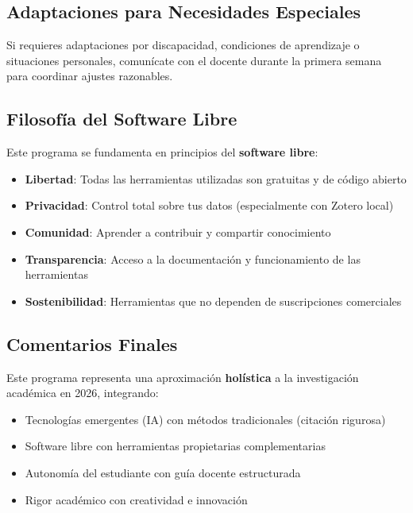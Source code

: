 \documentclass[12pt,a4paper]{yaac-luatex}
\begin{document}
	\subsection*{Adaptaciones para Necesidades Especiales}
	
	Si requieres adaptaciones por discapacidad, condiciones de aprendizaje o situaciones personales, comunícate con el docente durante la primera semana para coordinar ajustes razonables.
	
	\subsection*{Filosofía del Software Libre}
	
	Este programa se fundamenta en principios del \textbf{software libre}:
	
	\begin{itemize}[leftmargin=*, itemsep=0.2cm]
		\item \textbf{Libertad}: Todas las herramientas utilizadas son gratuitas y de código abierto
		\item \textbf{Privacidad}: Control total sobre tus datos (especialmente con Zotero local)
		\item \textbf{Comunidad}: Aprender a contribuir y compartir conocimiento
		\item \textbf{Transparencia}: Acceso a la documentación y funcionamiento de las herramientas
		\item \textbf{Sostenibilidad}: Herramientas que no dependen de suscripciones comerciales
	\end{itemize}
	
	\subsection*{Comentarios Finales}
	
	Este programa representa una aproximación \textbf{holística} a la investigación académica en 2026, integrando:
	
	\begin{itemize}[leftmargin=*, itemsep=0.2cm]
		\item Tecnologías emergentes (IA) con métodos tradicionales (citación rigurosa)
		\item Software libre con herramientas propietarias complementarias
		\item Autonomía del estudiante con guía docente estructurada
		\item Rigor académico con creatividad e innovación
	\end{itemize}
	
\end{document}
